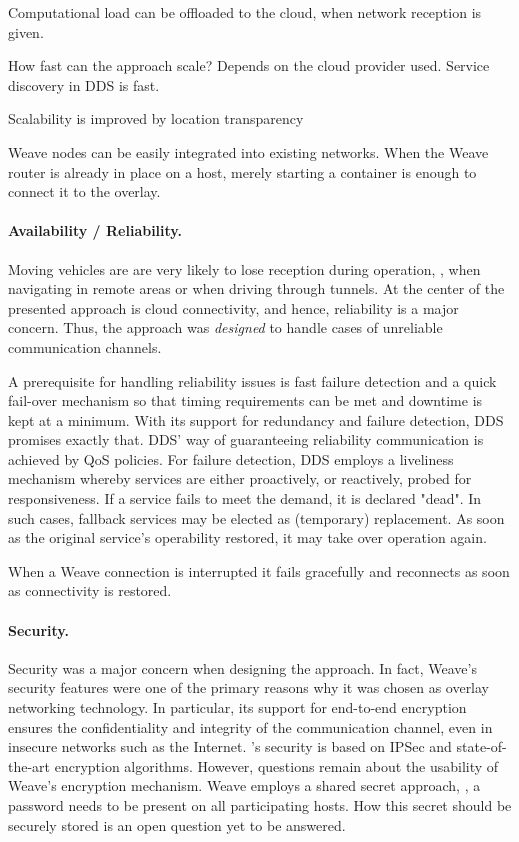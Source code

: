 Computational load can be offloaded to the cloud, when network reception is given.

How fast can the approach scale? Depends on the cloud provider used. Service discovery in DDS is fast.

Scalability is improved by location transparency

Weave nodes can be easily integrated into existing networks. When the Weave router is already in place on a host, merely starting a container is enough to connect it to the overlay.



\paragraph{Availability / Reliability.}
Moving vehicles are are very likely to lose reception during operation, \eg , when navigating in remote areas or when driving through tunnels. At the center of the presented approach is cloud connectivity, and hence, reliability is a major concern. Thus, the approach was \emph{designed} to handle cases of unreliable communication channels.

A prerequisite for handling reliability issues is fast failure detection and a quick fail-over mechanism so that timing requirements can be met and downtime is kept at a minimum. With its support for redundancy and failure detection, DDS promises exactly that. DDS' way of guaranteeing reliability communication is achieved by QoS policies. For failure detection, DDS employs a liveliness mechanism whereby services are either proactively, or reactively, probed for responsiveness. If a service fails to meet the demand, it is declared "dead". In such cases, fallback services may be elected as (temporary) replacement. As soon as the original service's operability restored, it may take over operation again.

\wnet 

When a Weave connection is interrupted it fails gracefully and reconnects as soon as connectivity is restored.

\paragraph{Security.}
Security was a major concern when designing the approach. In fact, Weave's security features were one of the primary reasons why it was chosen as overlay networking technology. In particular, its support for end-to-end encryption ensures the confidentiality and integrity of the communication channel, even in insecure networks such as the Internet. \wnet 's security is based on IPSec and state-of-the-art encryption algorithms. However, questions remain about the usability of Weave's encryption mechanism. Weave employs a shared secret approach, \ie , a password needs to be present on all participating hosts. How this secret should be securely stored is an open question yet to be answered.

